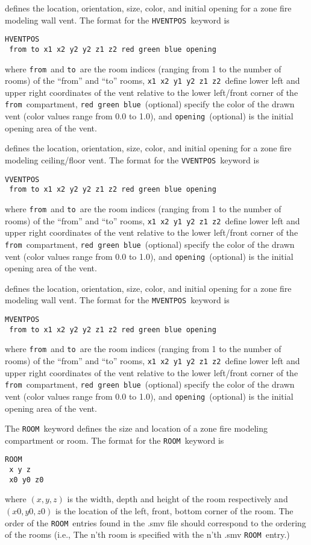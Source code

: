 \documentclass[11pt,twoside]{book}
\begin{document}
{ defines the location, orientation, size, color, and initial opening for a zone fire modeling wall vent.
The format for the {\tt HVENTPOS}\ keyword is
\begin{lstlisting}
HVENTPOS
 from to x1 x2 y2 y2 z1 z2 red green blue opening
\end{lstlisting}
where {\tt from}\ and {\tt to}\  are the room indices
(ranging from 1 to the number of rooms) of the ``from'' and ``to'' rooms, {\tt x1 x2 y1 y2 z1 z2}\ define lower left and upper right
coordinates of the vent relative to the lower left/front corner of the {\tt from}\ compartment, {\tt red green blue}\ (optional) specify the
color of the drawn vent (color values range from 0.0 to 1.0), and {\tt opening}\ (optional) is the initial opening area of the vent.

 defines the location, orientation, size, color, and initial opening for a zone fire modeling ceiling/floor vent.
The format for the {\tt VVENTPOS}\ keyword is
\begin{lstlisting}
VVENTPOS
 from to x1 x2 y2 y2 z1 z2 red green blue opening
\end{lstlisting}
where {\tt from}\ and {\tt to}\  are the room indices
(ranging from 1 to the number of rooms) of the ``from'' and ``to'' rooms, {\tt x1 x2 y1 y2 z1 z2}\ define lower left and upper right
coordinates of the vent relative to the lower left/front corner of the {\tt from}\ compartment, {\tt red green blue}\ (optional) specify the
color of the drawn vent (color values range from 0.0 to 1.0), and {\tt opening}\ (optional) is the initial opening area of the vent.

 defines the location, orientation, size, color, and initial opening for a zone fire modeling wall vent.
The format for the {\tt MVENTPOS}\ keyword is
\begin{lstlisting}
MVENTPOS
 from to x1 x2 y2 y2 z1 z2 red green blue opening
\end{lstlisting}
where {\tt from}\ and {\tt to}\  are the room indices
(ranging from 1 to the number of rooms) of the ``from'' and ``to'' rooms, {\tt x1 x2 y1 y2 z1 z2}\ define lower left and upper right
coordinates of the vent relative to the lower left/front corner of the {\tt from}\ compartment, {\tt red green blue}\ (optional) specify the
color of the drawn vent (color values range from 0.0 to 1.0), and {\tt opening}\ (optional) is the initial opening area of the vent.

The {\tt ROOM}\ keyword defines the size and
location of a zone fire modeling compartment or room.
The format for the {\tt ROOM}\ keyword is
\begin{lstlisting}
ROOM
 x y z
 x0 y0 z0
\end{lstlisting}
where $(x,y,z)$ is the width, depth and height of the room
respectively and $(x0,y0,z0)$ is the location of the
left, front, bottom corner of the room.
The order of the {\tt ROOM}\ entries found in the .smv file should correspond
to the ordering of the rooms (i.e., The n'th room is specified
with the n'th .smv {\tt ROOM}\ entry.)

}
\end{document}
